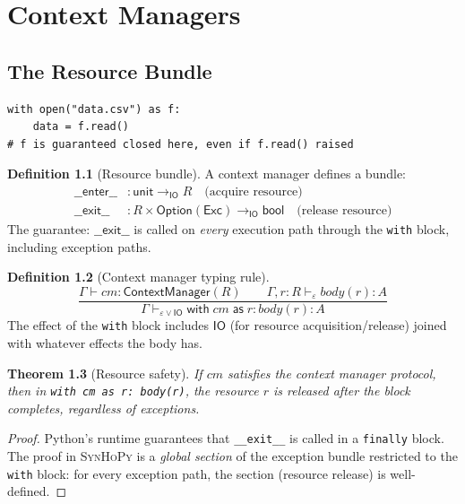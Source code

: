 \documentclass[11pt,a4paper]{report}
\theoremstyle{definition}
\newtheorem{definition}{Definition}[chapter]
\theoremstyle{plain}
\newtheorem{theorem}[definition]{Theorem}
\newcommand{\IO}{\mathsf{IO}}
\newcommand{\synhopy}{\textsc{SynHoPy}}
\begin{document}
\chapter{Context Managers}
\label{ch:context-managers}

\section{The Resource Bundle}

\begin{lstlisting}[style=python]
with open("data.csv") as f:
    data = f.read()
# f is guaranteed closed here, even if f.read() raised
\end{lstlisting}

\begin{definition}[Resource bundle]
A context manager defines a bundle:
\begin{align}
  \mathsf{\_\_enter\_\_} &: \mathsf{unit} \to_{\IO} R \quad \text{(acquire resource)} \\
  \mathsf{\_\_exit\_\_} &: R \times \mathsf{Option}(\mathsf{Exc}) \to_{\IO} \mathsf{bool} \quad \text{(release resource)}
\end{align}
The guarantee: $\mathsf{\_\_exit\_\_}$ is called on \emph{every} execution path
through the \texttt{with} block, including exception paths.
\end{definition}

\begin{definition}[Context manager typing rule]
\[
  \frac{
    \Gamma \vdash \mathit{cm} : \mathsf{ContextManager}(R) \qquad
    \Gamma, r : R \vdash_\varepsilon \mathit{body}(r) : A
  }{
    \Gamma \vdash_{\varepsilon \vee \IO} \mathsf{with}\;\mathit{cm}\;\mathsf{as}\;r : \mathit{body}(r) : A
  }
\]
The effect of the \texttt{with} block includes $\IO$ (for resource acquisition/release)
joined with whatever effects the body has.
\end{definition}

\begin{theorem}[Resource safety]
If $\mathit{cm}$ satisfies the context manager protocol, then in
\lstinline[style=python]{with cm as r: body(r)}, the resource $r$ is released
after the block completes, regardless of exceptions.
\end{theorem}
\begin{proof}
Python's runtime guarantees that \lstinline[style=python]{__exit__} is called
in a \lstinline[style=python]{finally} block. The proof in \synhopy{} is a
\emph{global section} of the exception bundle restricted to the \texttt{with}
block: for every exception path, the section (resource release) is well-defined.
\end{proof}
\end{document}
